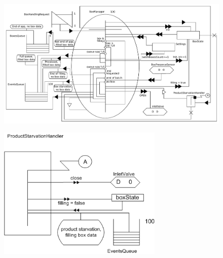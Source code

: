 \documentclass{beamer}
\begin{document}
	\begin{frame}
	\begin{figure}
		\centering
		\includegraphics[width=\textwidth]{../../SchemasLCG/BoxManager.pdf}
	\end{figure}
	\end{frame}

	\begin{frame}
	\begin{figure}
		\centering
		\includegraphics[width=0.7\textwidth]{../../SchemasLCG/ProductStarvationHandler.png}
	\end{figure}
	\end{frame}
\end{document}
